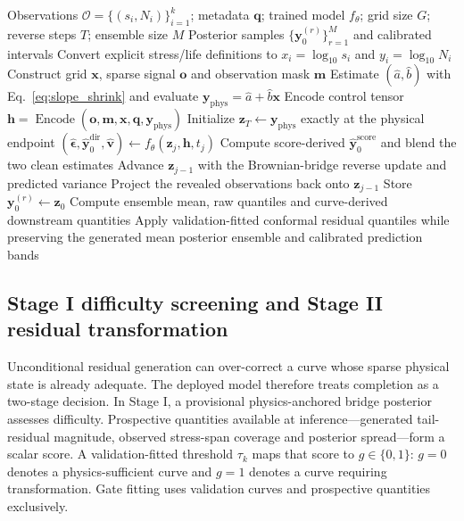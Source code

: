 \documentclass[a4paper,fleqn]{cas-dc}
\newcommand{\vect}[1]{\boldsymbol{#1}}
\begin{document}
\begin{algorithm*}[t]
\caption{Physics-anchored conditional generation for one sparse S--N curve}
\label{alg:inference}
\begin{algorithmic}[1]
\Require Observations $\mathcal{O}=\{(s_i,N_i)\}_{i=1}^{k}$; metadata $\vect{q}$; trained model $f_\theta$; grid size $G$; reverse steps $T$; ensemble size $M$
\Ensure Posterior samples $\{\vect{y}_0^{(r)}\}_{r=1}^{M}$ and calibrated intervals
\State Convert explicit stress/life definitions to $x_i=\log_{10}s_i$ and $y_i=\log_{10}N_i$
\State Construct grid $\vect{x}$, sparse signal $\vect{o}$ and observation mask $\vect{m}$
\State Estimate $(\hat a,\hat b)$ with Eq.~\eqref{eq:slope_shrink} and evaluate $\vect{y}_{\mathrm{phys}}=\hat a+\hat b\vect{x}$
\State Encode control tensor $\vect{h}=\operatorname{Encode}(\vect{o},\vect{m},\vect{x},\vect{q},\vect{y}_{\mathrm{phys}})$
  \State Initialize $\vect{z}_{T}\leftarrow\vect{y}_{\mathrm{phys}}$ exactly at the physical endpoint
    \State $(\hat{\vect{\epsilon}},\hat{\vect{y}}_0^{\mathrm{dir}},\hat{\vect{v}})\leftarrow f_\theta(\vect{z}_j,\vect{h},t_j)$
    \State Compute score-derived $\hat{\vect{y}}_0^{\mathrm{score}}$ and blend the two clean estimates
    \State Advance $\vect{z}_{j-1}$ with the Brownian-bridge reverse update and predicted variance
    \State Project the revealed observations back onto $\vect{z}_{j-1}$
  \EndFor
  \State Store $\vect{y}_0^{(r)}\leftarrow\vect{z}_{0}$
\EndFor
\State Compute ensemble mean, raw quantiles and curve-derived downstream quantities
\State Apply validation-fitted conformal residual quantiles while preserving the generated mean
\State \Return posterior ensemble and calibrated prediction bands
\end{algorithmic}
\end{algorithm*}

\subsection{Stage I difficulty screening and Stage II residual transformation}

Unconditional residual generation can over-correct a curve whose sparse physical state is already adequate. The deployed model therefore treats completion as a two-stage decision. In Stage I, a provisional physics-anchored bridge posterior assesses difficulty. Prospective quantities available at inference---generated tail-residual magnitude, observed stress-span coverage and posterior spread---form a scalar score. A validation-fitted threshold $\tau_k$ maps that score to $g\in\{0,1\}$: $g=0$ denotes a physics-sufficient curve and $g=1$ denotes a curve requiring transformation. Gate fitting uses validation curves and prospective quantities exclusively.
\end{document}

